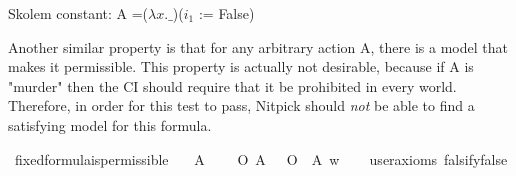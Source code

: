 \begin{isabellebody}
{  Skolem constant:
    A =($\lambda x. \_$)($i_1$ := False) \color{black}%
}\isanewline
%
%
\endisatagproof
{\isafoldproof}%
%
\isadelimproof
%
\endisadelimproof
%
\begin{isamarkuptext}%
Another similar property is that for any arbitrary action A, there is a model that makes 
it permissible. This property is actually not desirable, because if A is "murder" then the CI should require that 
it be prohibited in every world. Therefore, in order for this test to pass, Nitpick should \emph{not}
be able to find a satisfying model for this formula.%
\end{isamarkuptext}\isamarkuptrue%
\isamarkupfalse%
\ fixed{\isacharunderscore}formula{\isacharunderscore}is{\isacharunderscore}permissible{\isacharcolon}\isanewline
\ \ \ A\isanewline
\ \ \ {\isachardoublequoteopen}{\isacharparenleft}{\isacharparenleft}\isactrlbold {\isasymnot}\ {\isacharparenleft}O\ {\isacharbraceleft}A{\isacharbraceright}{\isacharparenright}{\isacharparenright}\ \isactrlbold {\isasymand}\ {\isacharparenleft}\isactrlbold {\isasymnot}\ {\isacharparenleft}O\ {\isacharbraceleft}\isactrlbold {\isasymnot}\ A{\isacharbraceright}{\isacharparenright}{\isacharparenright}{\isacharparenright}\ w{\isachardoublequoteclose}\isanewline
\ \ \isamarkupfalse%
\ {\isacharbrackleft}user{\isacharunderscore}axioms{\isacharcomma}\ falsify{\isacharequal}false{\isacharbrackright}%
\isadelimproof
\ %
\endisadelimproof
%
\isatagproof
{}\isamarkupfalse%
\isanewline
%
\end{isabellebody}
